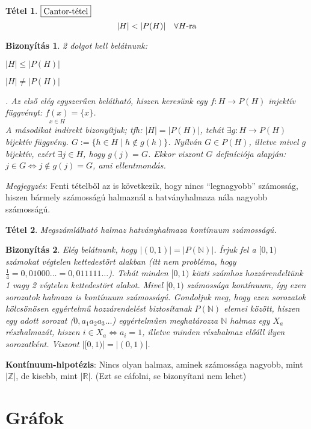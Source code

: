\documentclass[a4paper,12pt,twoside]{book}
\newcommand{\N}{\mathbb{N}}
\newtheorem{tetel}{Tétel}[chapter]
\newtheorem{biz}{Bizonyítás}[chapter]
\theoremstyle{break}
\begin{document}
\begin{tetel} $\boxed{$Cantor-tétel$}$
 \[|H|<|P(H)| \quad \forall H \hbox{-ra}\]
\end{tetel}
\begin{biz}
 2 dolgot kell belátnunk: \begin{inparaenum}[1.)]
\item $|H| \leqslant |P(H)|$
\item $|H| \neq |P(H)|$
\end{inparaenum}. Az első elég egyszerűen belátható, hiszen keresünk egy $f: H \to P(H)$ injektív függvényt: $\underset{x\in H}{f(x)} = \{x\}$.\\
A másodikat indirekt bizonyítjuk; tfh: $|H|=|P(H)|$, tehát $\exists g: H \to P(H)$ bijektív függvény. $G := \{h\in H\;|\; h\notin g(h)\}$. Nyílván $G \in P(H)$, illetve mivel $g$ bijektív, ezért $\exists j\in H$, hogy $g(j)=G$. Ekkor viszont $G$ definíciója alapján: $j\in G \Leftrightarrow j\notin g(j)=G$, ami ellentmondás.
\end{biz}

\emph{Megjegyzés}: Fenti tételből az is következik, hogy nincs ``legnagyobb'' számosság, hiszen bármely számosságú halmaznál a hatványhalmaza nála nagyobb számosságú.

\begin{tetel}
Megszámlálható halmaz hatványhalmaza kontínuum számosságú.
\end{tetel}
\begin{biz}
 Elég belátnunk, hogy $|(0,1)|=|P(\N)|$. Írjuk fel a $[0,1)$ számokat végtelen kettedestört alakban (itt nem probléma, hogy $\frac{1}{4}=0,01000\ldots = 0,011111\ldots$). Tehát minden $[0,1)$ közti számhoz hozzárendeltünk 1 vagy 2 végtelen kettedestört alakot. Mivel $[0,1)$ számossága kontínuum, így ezen sorozatok halmaza is kontínuum számosságú. Gondoljuk meg, hogy ezen sorozatok kölcsönösen egyértelmű hozzárendelést biztosítanak $P(\N)$ elemei között, hiszen egy adott sorozat ($0,a_1a_2a_3\ldots$) egyértelműen meghatározza $\N$ halmaz egy $X_a$ részhalmazát, hiszen $i\in X_a \Leftrightarrow a_i = 1$, illetve minden részhalmaz előáll ilyen sorozatként. Viszont $|[0,1)|=|(0,1)|$.
\end{biz}

\textbf{Kontínuum-hipotézis}: Nincs olyan halmaz, aminek számossága nagyobb, mint $|\mathbb{Z}|$, de kisebb, mint $|\mathbb{R}|$. (Ezt se cáfolni, se bizonyítani nem lehet)

\chapter{Gráfok}
\end{document}

